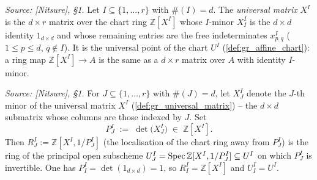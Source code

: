 \begin{definition}\leanok
  \label{def:gr_universal_matrix}
  \textit{Source: [Nitsure], \S 1.}
  Let \(I \subseteq \{1,\dots,r\}\) with \(\#(I) = d\). The \emph{universal
  matrix} \(X^I\) is the \(d \times r\) matrix over the chart ring
  \(\mathbb{Z}[X^I]\) whose \(I\)-minor \(X^I_I\) is the \(d \times d\) identity
  \(1_{d\times d}\) and whose remaining entries are the free indeterminates
  \(x^I_{p,q}\) (\(1 \le p \le d\), \(q \notin I\)). It is the universal point of
  the chart \(U^I\) (\cref{def:gr_affine_chart}): a ring map
  \(\mathbb{Z}[X^I] \to A\) is the same as a \(d \times r\) matrix over \(A\)
  with identity \(I\)-minor.
\end{definition}

\begin{definition}\leanok
  \label{def:gr_minor_det}
  \textit{Source: [Nitsure], \S 1.}
  For \(J \subseteq \{1,\dots,r\}\) with \(\#(J) = d\), let \(X^I_J\) denote the
  \(J\)-th minor of the universal matrix \(X^I\) (\cref{def:gr_universal_matrix})
  -- the \(d \times d\) submatrix whose columns are those indexed by \(J\). Set
  \[
    P^I_J \;:=\; \det\bigl(X^I_J\bigr) \;\in\; \mathbb{Z}[X^I].
  \]
  Then \(R^I_J := \mathbb{Z}[X^I, 1/P^I_J]\) (the localisation of the chart ring
  away from \(P^I_J\)) is the ring of the principal open subscheme
  \(U^I_J = \operatorname{Spec} \mathbb{Z}[X^I, 1/P^I_J] \subseteq U^I\) on which \(P^I_J\) is
  invertible. One has \(P^I_I = \det(1_{d\times d}) = 1\), so \(R^I_I =
  \mathbb{Z}[X^I]\) and \(U^I_I = U^I\).
\end{definition}

